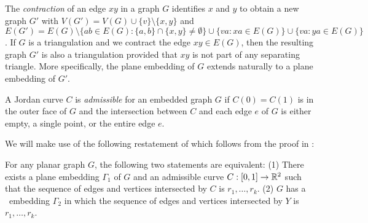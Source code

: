 The \emph{contraction} of an edge $xy$ in a graph $G$ identifies $x$ and $y$ to obtain a new graph $G'$ with
$V(G')=V(G)\cup\{v\}\setminus\{x,y\}$ and $E(G')=E(G)\setminus\{ab\in
E(G): \{a,b\}\cap\{x,y\}\neq\emptyset\}\cup\{va: xa\in E(G)\}\cup
\{va:ya\in E(G)\}$.  
If $G$ is a triangulation and we
contract the edge $xy\in E(G)$, then the resulting graph $G'$ is also
a triangulation provided that $xy$ is not part of any separating
triangle. More specifically, the plane embedding of $G$ extends naturally
to a plane embedding of $G'$.


A %
Jordan curve $C$ is \emph{admissible} for an
embedded graph $G$ if $C(0)=C(1)$ is in the outer face
of $G$ and the intersection between $C$ and each edge $e$ of $G$ is
either empty, a single point, or the entire edge $e$.  


We will make use of the following restatement of 
which follows from the proof in \cite{dalozzo.dujmovic.ea:drawing}:
\begin{thm}
	For any planar graph $G$, the following two statements are equivalent: (1) There exists a plane embedding $\Gamma_1$ of $G$ and an admissible curve $C:[0,1]\to\mathbb{R}^2$ such that the sequence of edges and vertices intersected by $C$ is $r_1,\ldots,r_k$. (2) $G$ has a \Fary\ embedding $\Gamma_2$ in which the sequence
		of edges and vertices intersected by $Y$ is $r_1,\ldots,r_k$.
\end{thm}

